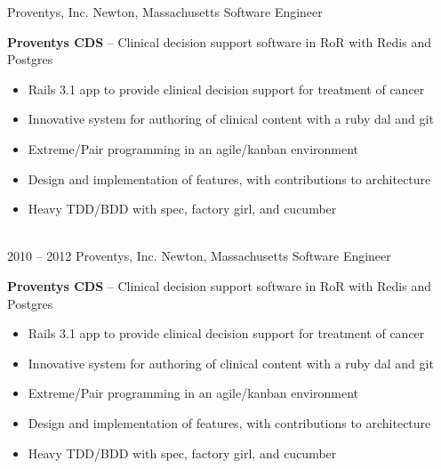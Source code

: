 \documentclass[]{friggeri-cv}
\begin{document}
\begin{entrylist}
    {Proventys, Inc.}
    {Newton, Massachusetts}
    {Software Engineer}
    {\textbf{Proventys CDS} -- Clinical decision support software in RoR with Redis and Postgres
    \begin{itemize}
      \item Rails 3.1 app to provide clinical decision support for treatment of cancer
      \item Innovative system for authoring of clinical content with a ruby dal and git
      \item Extreme/Pair programming in an agile/kanban environment
      \item Design and implementation of features, with contributions to architecture
      \item Heavy TDD/BDD with spec, factory girl, and cucumber     
    \end{itemize}}
    \\
    \entryalt
    {2010 -- 2012}
    {Proventys, Inc.}
    {Newton, Massachusetts}
    {Software Engineer}
    {\textbf{Proventys CDS} -- Clinical decision support software in RoR with Redis and Postgres
    \begin{itemize}
      \item Rails 3.1 app to provide clinical decision support for treatment of cancer
      \item Innovative system for authoring of clinical content with a ruby dal and git
      \item Extreme/Pair programming in an agile/kanban environment
      \item Design and implementation of features, with contributions to architecture
      \item Heavy TDD/BDD with spec, factory girl, and cucumber     
    \end{itemize}}    
\end{entrylist}\\
    \\    
    
\end{document}
